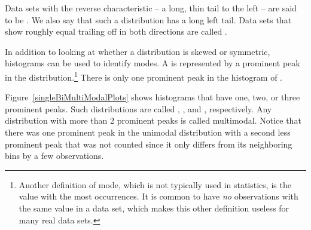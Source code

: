 \begin{doublespace}
Data sets with the reverse characteristic -- a long, thin tail to the left -- are said to be . We also say that such a distribution has a long left tail. Data sets that show roughly equal trailing off in both directions are called .

In addition to looking at whether a distribution is skewed or symmetric, histograms can be used to identify modes. A  is represented by a prominent peak in the distribution.\footnote{Another definition of mode, which is not typically used in statistics, is the value with the most occurrences. It is common to have \emph{no} observations with the same value in a data set, which makes this other definition useless for many real data sets.} There is only one prominent peak in the histogram of .

Figure~\ref{singleBiMultiModalPlots} shows histograms that have one, two, or three prominent peaks. Such distributions are called , , and , respectively. Any distribution with more than 2 prominent peaks is called multimodal. Notice that there was one prominent peak in the unimodal distribution with a second less prominent peak that was not counted since it only differs from its neighboring bins by a few observations.


\end{doublespace}
